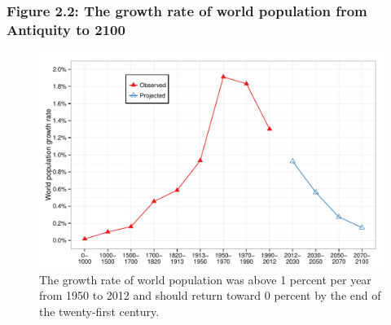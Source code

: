 \documentclass[t]{beamer}\usepackage[]{graphicx}\usepackage[]{color}
\newenvironment{knitrout}{}{} %
\begin{document}
\begin{frame}[label=Figure_2_2]
\frametitle{Figure 2.2: The growth rate of world population from Antiquity to 2100}
\begin{figure}[t]
\begin{minipage}[b]{\textwidth}
\centering
\begin{knitrout}\footnotesize
{}\color{fgcolor}

{\centering \includegraphics[width=1\linewidth]{figures/color/Figure_2_2} 

}



\end{knitrout}
\caption{The growth rate of world population was above 1 percent per year from 1950 to 2012 and should return toward 0 percent by the end of the twenty-first century.}
\end{minipage}
\end{figure}
\end{frame}
\end{document}
